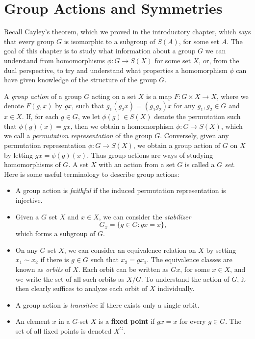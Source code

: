 \chapter{Group Actions and Symmetries}

Recall Cayley's theorem, which we proved in the introductory chapter, which says that every group $G$ is isomorphic to a subgroup of $S(A)$, for some set $A$. The goal of this chapter is to study what information about a group $G$ we can understand from homomorphisms $\phi: G \to S(X)$ for some set $X$, or, from the dual perspective, to try and understand what properties a homomorphism $\phi$ can have given knowledge of the structure of the group $G$.

A \emph{group action} of a group $G$ acting on a set $X$ is a map $F:G \times X \to X$, where we denote $F(g,x)$ by $gx$, such that $g_1(g_2x) = (g_1g_2)x$ for any $g_1,g_2 \in G$ and $x \in X$. If, for each $g \in G$, we let $\phi(g) \in S(X)$ denote the permutation such that $\phi(g)(x) = gx$, then we obtain a homomorphism $\phi: G \to S(X)$, which we call a \emph{permutation representation} of the group $G$. Conversely, given any permutation representation $\phi: G \to S(X)$, we obtain a group action of $G$ on $X$ by letting $gx = \phi(g)(x)$. Thus group actions are ways of studying homomorphisms of $G$. A set $X$ with an action from a set $G$ is called a \emph{$G$ set}. Here is some useful terminology to describe group actions:
%
\begin{itemize}
    \item A group action is \emph{faithful} if the induced permutation representation is injective.

    \item Given a $G$ set $X$ and $x \in X$, we can consider the \emph{stabilizer}
    \[ G_x = \{ g \in G: gx = x \}, \]
    which forms a subgroup of $G$. 

    \item On any $G$ set $X$, we can consider an equivalence relation on $X$ by setting $x_1 \sim x_2$ if there is $g \in G$ such that $x_2 = gx_1$. The equivalence classes are known as \emph{orbits} of $X$. Each orbit can be written as $Gx$, for some $x \in X$, and we write the set of all such orbits as $X/G$. To understand the action of $G$, it then clearly suffices to analyze each orbit of $X$ individually.

    \item A group action is \emph{transitive} if there exists only a single orbit.

    \item An element $x$ in a $G$-set $X$ is a {\bf fixed point} if $gx = x$ for every $g \in G$. The set of all fixed points is denoted $X^G$.
\end{itemize}

